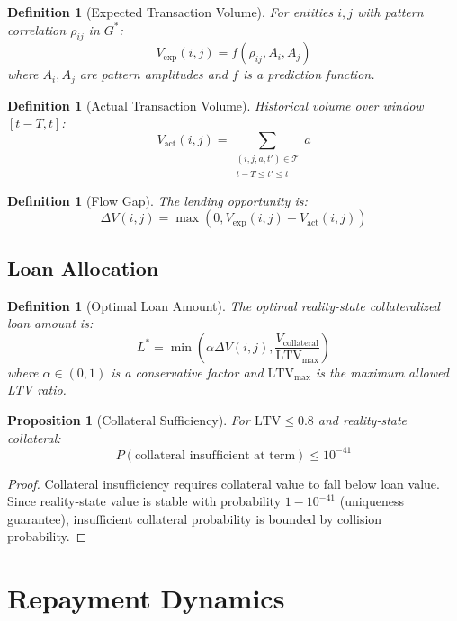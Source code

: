 \documentclass[12pt]{article}
\newtheorem{definition}[theorem]{Definition}
\newtheorem{proposition}[theorem]{Proposition}
\begin{document}
\begin{definition}[Expected Transaction Volume]
For entities $i,j$ with pattern correlation $\rho_{ij}$ in $G^*$:
$$
V_{\text{exp}}(i,j) = f(\rho_{ij}, A_i, A_j)
$$
where $A_i, A_j$ are pattern amplitudes and $f$ is a prediction function.
\end{definition}

\begin{definition}[Actual Transaction Volume]
Historical volume over window $[t-T, t]$:
$$
V_{\text{act}}(i,j) = \sum_{\substack{(i,j,a,t') \in \mathcal{T} \\ t-T \leq t' \leq t}} a
$$
\end{definition}

\begin{definition}[Flow Gap]
The lending opportunity is:
$$
\Delta V(i,j) = \max(0, V_{\text{exp}}(i,j) - V_{\text{act}}(i,j))
$$
\end{definition}

\subsection{Loan Allocation}

\begin{definition}[Optimal Loan Amount]
The optimal reality-state collateralized loan amount is:
$$
L^* = \min\left(\alpha \Delta V(i,j), \frac{V_{\text{collateral}}}{\text{LTV}_{\text{max}}}\right)
$$
where $\alpha \in (0,1)$ is a conservative factor and $\text{LTV}_{\text{max}}$ is the maximum allowed LTV ratio.
\end{definition}

\begin{proposition}[Collateral Sufficiency]
For $\text{LTV} \leq 0.8$ and reality-state collateral:
$$
P(\text{collateral insufficient at term}) \leq 10^{-41}
$$
\end{proposition}

\begin{proof}
Collateral insufficiency requires collateral value to fall below loan value. Since reality-state value is stable with probability $1 - 10^{-41}$ (uniqueness guarantee), insufficient collateral probability is bounded by collision probability.
\end{proof}

\section{Repayment Dynamics}
\end{document}
